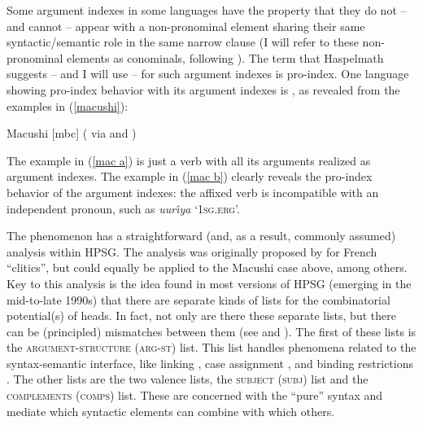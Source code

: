 \documentclass[output=paper
                ,modfonts
                ,nonflat
	        ,collection
	        ,collectionchapter
	        ,collectiontoclongg
 	        ,biblatex
                ,babelshorthands
                ,newtxmath
                ,draftmode
                ,colorlinks, citecolor=brown
]{./langsci/langscibook}
\begin{document}
{Some argument indexes in some languages have the property that they do not -- and cannot -- appear with a non-pronominal element sharing their same syntactic/semantic role in the same narrow clause (I will refer to these non-pronominal elements as conominals, following \citealt{haspelmath13}). The term that Haspelmath suggests -- and I will use -- for such argument indexes is pro-index. One language showing pro-index behavior with its argument indexes is , as revealed from the examples in (\ref{macushi}): 
%
\begin{samepage}
\begin{exe}
\ex \label{macushi} Macushi [mbc] (\citealt{abbott91} via \citealt{siewierska99} and \citealt{corbett03}) \nolistbreak
\begin{xlist}
\end{xlist}
\end{exe}
\end{samepage}
The example in (\ref{mac a}) is just a verb with all its arguments realized as argument indexes. The example in (\ref{mac b}) clearly reveals the pro-index behavior of the argument indexes: the affixed verb is incompatible with an independent pronoun, such as \textit{uur\^{\i}ya} `\textsc{1sg.erg}'. 

The  phenomenon has a straightforward (and, as a result, commonly assumed) analysis within HPSG. The analysis was originally proposed by \citet{MS97a-u} for French ``clitics'', but could equally be applied to the Macushi case above, among others. Key to this analysis is the idea found in most versions of HPSG (emerging in the mid-to-late 1990s) that there are separate kinds of lists for the combinatorial potential(s) of heads. In fact, not only are there these separate lists, but there can be (principled) mismatches between them (see  and ). The first of these lists is the \textsc{argument-structure} (\textsc{arg-st}) list. This list handles phenomena related to the syntax-semantic interface, like linking \citep{Davis2001a-u}, case assignment \citep{Prze99b}, and binding restrictions \citep{mannsag98,wecharka98}. The other lists are the two valence lists, the \textsc{subject} (\textsc{subj}) list and the \textsc{complements} (\textsc{comps}) list. These are concerned with the ``pure'' syntax and mediate which syntactic elements can combine with which others.

}
\end{document}

